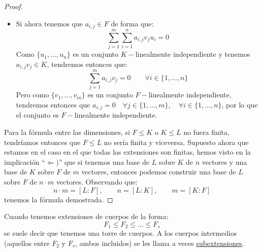 \begin{lema}[de la Torre]
\begin{proof}
\begin{description}
\begin{itemize}
                        de donde:
                        \begin{align*}
                            \alpha &= u_1(a_{1,1}v_1 + \ldots + a_{1,m}v_m) + \ldots + u_n(a_{n,1}v_1 + \ldots + a_{n,m}v_m) \\
                                   &= a_{1,1}u_1v_1 + a_{1,2}u_1v_2 + \ldots + a_{1,m}u_1v_m + \ldots + a_{n,m}u_nv_m
                        \end{align*}
                        Por lo que es un $F-$sistema de generadores.
                    \item Si ahora tenemos que $a_{i,j}\in F$ de forma que:
                        \begin{equation*}
                            \sum_{j=1}^{m}\sum_{i=1}^{n} a_{i,j}v_ju_i = 0
                        \end{equation*}
                        Como $\{u_1,\ldots,u_n\}$ es un conjunto $K-$linealmente independiente y tenemos $a_{i,j}v_j\in K$, tendremos entonces que:
                        \begin{equation*}
                            \sum_{j=1}^{m}a_{i,j}v_j = 0 \qquad \forall i \in \{1,\ldots,n\}
                        \end{equation*}
                        Pero como $\{v_1,\ldots,v_m\}$ es un conjunto $F-$linealmente independiente, tendremos entonces que $a_{i,j} = 0 \quad \forall j \in \{1,\ldots,m\}, \quad \forall  i \in \{1,\ldots, n\}$, por lo que el conjunto es $F-$linealmente independiente.
                \end{itemize}
        \end{description}
        Para la fórmula entre las dimensiones, si $F\leq K$ o $K\leq L$ no fuera finita, tendríamos entonces que $F\leq L$ no sería finita y viceversa. Supuesto ahora que estamos en el caso en el que todas las extensiones son finitas, hemos visto en la implicación ``$\Longleftarrow )$'' que si tenemos una base de $L$ sobre $K$ de $n$ vectores y una base de $K$ sobre $F$ de $m$ vectores, entonces podemos construir una base de $L$ sobre $F$ de $n\cdot m$ vectores. Observando que:
        \begin{equation*}
            n\cdot m = [L:F], \qquad n = [L:K], \qquad m = [K:F]
        \end{equation*}
        tenemos la fórmula demostrada.
    \end{proof}
\end{lema}

\begin{notacion}
    Cuando tenemos extensiones de cuerpos de la forma:
    \begin{equation*}
        F_1 \leq F_2 \leq \ldots \leq F_s
    \end{equation*}
    se suele decir que tenemos una torre de cuerpos. A los cuerpos intermedios (aquellos entre $F_2$ y $F_s$, ambos incluidos) se les llama a veces \underline{subextensiones}.
\end{notacion}

